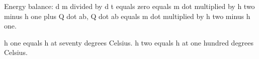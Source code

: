 Energy balance:  
d m divided by d t equals zero equals m dot multiplied by h two minus h one plus Q dot ab, Q dot ab equals m dot multiplied by h two minus h one.  

h one equals h at seventy degrees Celsius.  
h two equals h at one hundred degrees Celsius.